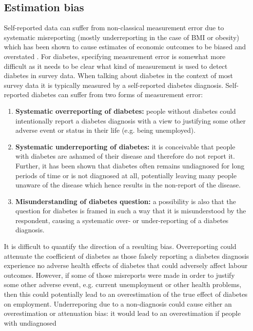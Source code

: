 \subsection{Estimation bias}

Self-reported data can suffer from non-classical measurement error
due to systematic misreporting (mostly underreporting in the case
of \ac{BMI} or obesity) which has been shown to cause estimates
of economic outcomes to be biased and overstated \citep{Cawley2015,ONeill2013,Perks2015}.
For diabetes, specifying measurement error is somewhat more difficult
as it needs to be clear what kind of measurement is used to detect
diabetes in survey data. When talking about diabetes in the context
of most survey data it is typically measured by a self-reported diabetes
diagnosis. Self-reported diabetes can suffer from two forms of measurement
error: 
\begin{enumerate}
\item \textbf{Systematic overreporting of diabetes:} people without diabetes
could intentionally report a diabetes diagnosis with a view to justifying
some other adverse event or status in their life (e.g. being unemployed). 
\item \textbf{Systematic underreporting of diabetes:} it is conceivable
that people with diabetes are ashamed of their disease and therefore
do not report it. Further, it has been shown that diabetes often remains
undiagnosed for long periods of time or is not diagnosed at all, potentially
leaving many people unaware of the disease which hence results in
the non-report of the disease. 
\item \textbf{Misunderstanding of diabetes question:} a possibility is also
that the question for diabetes is framed in such a way that it is
misunderstood by the respondent, causing a systematic over- or under-reporting
of a diabetes diagnosis. 
\end{enumerate}
It is difficult to quantify the direction of a resulting bias. Overreporting
could attenuate the coefficient of diabetes as those falsely reporting a diabetes diagnosis experience no adverse health
effects of diabetes that could adversely affect labour outcomes. However, if some of those misreports were
made in order to justify some other adverse event, e.g. current unemployment
or other health problems, then this could potentially lead to an overestimation
of the true effect of diabetes on employment. Underreporing due to
a non-diagnosis could cause either an overestimation or attenuation
bias: it would lead to an overestimation if people with undiagnosed
